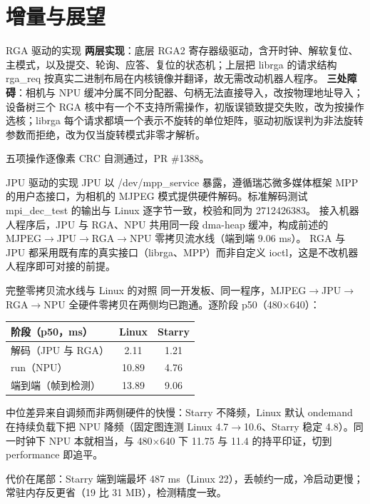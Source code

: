 \documentclass[aspectratio=169,fontset=mac]{ctexbeamer}
\newcommand{\keyline}[1]{\par\vskip3pt\noindent\colorbox{tintbox}{\parbox{0.91\textwidth}{\color{ink}#1}}\par}
\begin{document}
%
\section{增量与展望}

\begin{frame}{RGA 驱动的实现}
\small
\textbf{两层实现}：底层 RGA2 寄存器级驱动，含开时钟、解软复位、主模式，以及提交、轮询、应答、复位的状态机；上层把 librga 的请求结构 rga\_req 按真实二进制布局在内核镜像并翻译，故无需改动机器人程序。
\vskip4pt
\textbf{三处障碍}：相机与 NPU 缓冲分属不同分配器、句柄无法直接导入，改按物理地址导入；设备树三个 RGA 核中有一个不支持所需操作，初版误锁致提交失败，改为按操作选核；librga 每个请求都填一个表示不旋转的单位矩阵，驱动初版误判为非法旋转参数而拒绝，改为仅当旋转模式非零才解析。
\keyline{五项操作逐像素 CRC 自测通过，PR \#1388。}
\end{frame}

\begin{frame}{JPU 驱动的实现}
JPU 以 /dev/mpp\_service 暴露，遵循瑞芯微多媒体框架 MPP 的用户态接口，为相机的 MJPEG 模式提供硬件解码。标准解码测试 mpi\_dec\_test 的输出与 Linux 逐字节一致，校验和同为 2712426383。
\vskip5pt
接入机器人程序后，JPU 与 RGA、NPU 共用同一段 dma-heap 缓冲，构成前述的 MJPEG$\to$JPU$\to$RGA$\to$NPU 零拷贝流水线（端到端 9.06 ms）。
\vskip5pt
\footnotesize RGA 与 JPU 都采用既有库的真实接口（librga、MPP）而非自定义 ioctl，这是不改机器人程序即可对接的前提。
\end{frame}

\begin{frame}{完整零拷贝流水线与 Linux 的对照}
\small
同一开发板、同一程序，MJPEG$\to$JPU$\to$RGA$\to$NPU 全硬件零拷贝在两侧均已跑通。逐阶段 p50（480×640）：
\vskip3pt
\begin{center}\footnotesize
\begin{tabular}{lcc}
\toprule
阶段（p50，ms）& Linux & Starry\\
\midrule
解码（JPU 与 RGA）& 2.11 & 1.21\\
run（NPU）& 10.89 & 4.76\\
端到端（帧到检测）& 13.89 & 9.06\\
\bottomrule
\end{tabular}
\end{center}
\vskip3pt
中位差异来自调频而非两侧硬件的快慢：Starry 不降频，Linux 默认 ondemand 在持续负载下把 NPU 降频（固定图连测 Linux 4.7$\to$10.6、Starry 稳定 4.8）。同一时钟下 NPU 本就相当，与 480×640 下 11.75 与 11.4 的持平印证，切到 performance 即追平。
\keyline{代价在尾部：Starry 端到端最坏 487 ms（Linux 22），丢帧约一成，冷启动更慢；常驻内存反更省（19 比 31 MB），检测精度一致。}
\end{frame}
\end{document}
